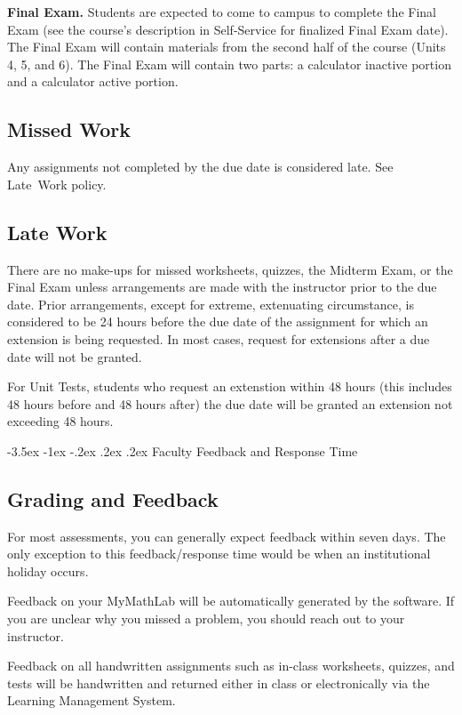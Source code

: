 \documentclass[11pt]{article}
\makeatletter
\renewcommand\section{\@startsection{section}{1}{0pt}%
  {-3.5ex \@plus -1ex \@minus -.2ex}%
  {.2ex \@plus.2ex}%
  {\normalfont\Large\bfseries}} %
\makeatother
\begin{document}
\textbf{Final Exam.} Students are expected to come to campus to complete the Final Exam (see the course's description in Self-Service for finalized Final Exam date). The Final Exam will contain materials from the second half of the course (Units 4, 5, and 6). The Final Exam will contain two parts: a calculator inactive portion and a calculator active portion.

\subsection{Missed Work}

Any assignments not completed by the due date is considered late. See Late~Work policy.

\subsection{Late Work}

There are no make-ups for missed worksheets, quizzes, the Midterm Exam, or the Final Exam unless arrangements are made with the instructor prior to the due date. Prior arrangements, except for extreme, extenuating circumstance, is considered to be 24 hours before the due date of the assignment for which an extension is being requested. In most cases, request for extensions after a due date will not be granted.

For Unit Tests, students who request an extenstion within 48 hours (this includes 48 hours before and 48 hours after) the due date will be granted an extension not exceeding 48 hours.

\section{Faculty Feedback and Response Time}

\subsection{Grading and Feedback}

For most assessments, you can generally expect feedback within seven days. The only exception to this feedback/response time would be when an institutional holiday occurs.

Feedback on your MyMathLab will be automatically generated by the software. If you are unclear why you missed a problem, you should reach out to your instructor.

Feedback on all handwritten assignments such as in-class worksheets, quizzes, and tests will be handwritten and returned either in class or electronically via the Learning Management System.
\end{document}
